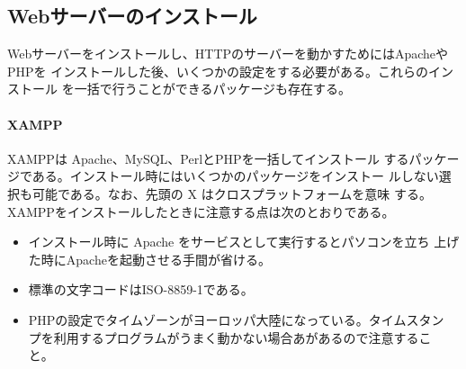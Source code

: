 \subsection{Webサーバーのインストール}
Webサーバーをインストールし、HTTPのサーバーを動かすためにはApacheやPHPを
インストールした後、いくつかの設定をする必要がある。これらのインストール
を一括で行うことができるパッケージも存在する。
\paragraph{XAMPP}XAMPPは Apache、MySQL、PerlとPHPを一括してインストール
するパッケージである。インストール時にはいくつかのパッケージをインストー
ルしない選択も可能である。なお、先頭の X はクロスプラットフォームを意味
する。XAMPPをインストールしたときに注意する点は次のとおりである。
\begin{itemize}
 \item インストール時に Apache をサービスとして実行するとパソコンを立ち
       上げた時にApacheを起動させる手間が省ける。
 \item 標準の文字コードはISO-8859-1である。
 \item PHPの設定でタイムゾーンがヨーロッパ大陸になっている。タイムスタン
       プを利用するプログラムがうまく動かない場合あがあるので注意するこ
       と。
\end{itemize}





